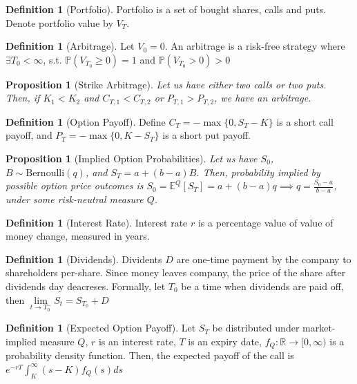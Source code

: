 \documentclass[11pt,a4paper]{article}
\theoremstyle{plain}
\newtheorem{proposition}[theorem]{Proposition}
\theoremstyle{definition}
\newtheorem{definition}[theorem]{Definition}
\theoremstyle{remark}
\newcommand{\1}{\mathbf{1}}
\begin{document}
\begin{definition}[Portfolio]
  Portfolio is a set of bought shares, calls and puts. Denote portfolio value by $V_T$.
\end{definition}

\begin{definition}[Arbitrage]
  Let $V_0=0$. An arbitrage is a risk-free strategy where $\exists T_0<\infty$, s.t. $\mathbb{P}(V_{T_0}\ge0)=1$ and $\mathbb{P}(V_{T_0}>0)>0$
\end{definition}

\begin{proposition}[Strike Arbitrage]
  Let us have either two calls or two puts. Then, if $K_1<K_2$ and $C_{T,1}<C_{T,2}$ or $P_{T,1}>P_{T,2}$, we have an arbitrage.
\end{proposition}

\begin{definition}[Option Payoff]
  Define $C_T=-\max\{0,S_T-K\}$ is a short call payoff, and $P_T=-\max\{0,K-S_T\}$ is a short put payoff.
\end{definition}

\begin{proposition}[Implied Option Probabilities]
  Let us have $S_0$, $B\sim\mathrm{Bernoulli}(q)$, and $S_T=a+(b-a)B$. Then, probability implied by possible option price outcomes is $S_0=\mathbb{E}^Q[S_T]=a+(b-a)q\implies q=\frac{S_0-a}{b-a}$, under some risk-neutral measure $Q$.
\end{proposition}

\begin{definition}[Interest Rate]
  Interest rate $r$ is a percentage value of value of money change, measured in years.
\end{definition}

\begin{definition}[Dividends]
  Dividents $D$ are one-time payment by the company to shareholders per-share. Since money leaves company, the price of the share after dividends day deacreses. Formally, let $T_0$ be a time when dividends are paid off, then $\lim\limits_{t\to T_0^-}S_t=S_{T_0}+D$
\end{definition}

\begin{definition}[Expected Option Payoff]
  Let $S_T$ be distributed under market-implied measure $Q$, $r$ is an interest rate, $T$ is an expiry date, $f_Q:\mathbb{R}\rightarrow[0,\infty)$ is a probability density function. Then, the expected payoff of the call is $e^{-rT}\displaystyle\int_{K}^{\infty}(s-K)f_Q(s)ds$
\end{definition}
\end{document}
